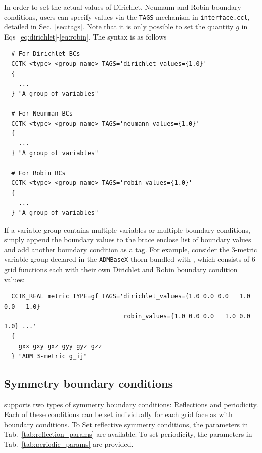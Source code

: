 In order to set the actual values of Dirichlet, Neumann and Robin boundary conditions, users can specify values via the \texttt{TAGS} mechanism in \texttt{interface.ccl}, detailed in Sec.~\ref{sec:tags}. Note that it is only possible to set the quantity $g$ in Eqs~\eqref{eq:dirichlet}-\eqref{eq:robin}. The syntax is as follows

\begin{verbatim}
  # For Dirichlet BCs
  CCTK_<type> <group-name> TAGS='dirichlet_values={1.0}'
  {
    ...
  } "A group of variables"

  # For Neumman BCs
  CCTK_<type> <group-name> TAGS='neumann_values={1.0}'
  {
    ...
  } "A group of variables"

  # For Robin BCs
  CCTK_<type> <group-name> TAGS='robin_values={1.0}'
  {
    ...
  } "A group of variables"
\end{verbatim}

If a variable group contains multiple variables or multiple boundary conditions, simply append the boundary values to the brace enclose list of boundary values and add another boundary condition as a tag. For example, consider the 3-metric variable group declared in the \texttt{ADMBaseX} thorn bundled with \CarpetX, which consists of 6 grid functions each with their own Dirichlet and Robin boundary condition values:

\begin{verbatim}
  CCTK_REAL metric TYPE=gf TAGS='dirichlet_values={1.0 0.0 0.0   1.0 0.0   1.0}
                                 robin_values={1.0 0.0 0.0   1.0 0.0   1.0} ...'
  {
    gxx gxy gxz gyy gyz gzz
  } "ADM 3-metric g_ij"
\end{verbatim}

\subsection{Symmetry boundary conditions}

\CarpetX\space supports two types of symmetry boundary conditions: Reflections and periodicity. Each of these conditions can be set individually for each grid face as with boundary conditions. To Set reflective symmetry conditions, the parameters in Tab.~\ref{tab:reflection_params} are available. To set periodicity, the parameters in Tab.~\ref{tab:periodic_params} are provided.

